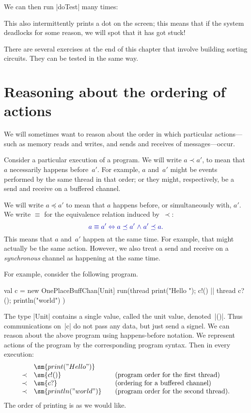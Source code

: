 We can then run |doTest| many times:
%
%
This also intermittently prints a dot on the screen; this means that if the
system deadlocks for some reason, we will spot that it has got stuck!

There are several exercises at the end of this chapter that involve building
sorting circuits.  They can be tested in the same way.


\section{Reasoning about the ordering of actions}

We will sometimes want to reason about the order in which particular
actions---such as memory reads and writes, and sends and receives of
messages---occur.

Consider a particular execution of a program.  We will write $a \prec a'$, to
mean that $a$ necessarily happens before~$a'$.  For example, $a$ and~$a'$
might be events performed by the same thread in that order; or they might,
respectively, be a send and receive on a buffered channel.

We will write $a \preceq a'$ to mean that $a$ happens before, or
simultaneously with, $a'$.  
%
We write $\equiv$ for the equivalence relation induced by~$\prec$:
\[\mstyle
a \equiv a' \iff a \preceq a' \land a' \preceq a.
\]
This means that $a$ and~$a'$ happen at the same time.  For example, that might
actually be the same action.  However, we also treat a send and receive on a
\emph{synchronous} channel as happening at the same time.

For example, consider the following program.
\begin{scala}
  val c = new OnePlaceBuffChan[Unit]
  run(thread{ print("Hello "); c!() } || thread{ c?(); println("world") })
\end{scala}
%
The type |Unit| contains a single value, called the unit value, denoted~|()|.
Thus communications on~|c| do not pass any data, but just send a signel.
%
We can reason about the above program using happens-before notation.  We
represent actions of the program by the corresponding program syntax.  Then in
every execution:
\[
\begin{array}{cl@{\qquad}l}
& \sm{print("Hello ")} \\
\prec & \sm{c!()} & \mbox{(program order for the first thread)} \\
\prec & \sm{c?{}} & \mbox{(ordering for a buffered channel)} \\
\prec & \sm{println("world")} & \mbox{(program order for the second thread).}
\end{array}
\]
The order of printing is as we would like. 

